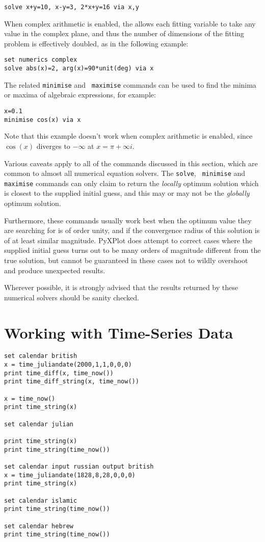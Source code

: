 \begin{verbatim}
solve x+y=10, x-y=3, 2*x+y=16 via x,y
\end{verbatim}

When complex arithmetic is enabled, the  allows each fitting
variable to take any value in the complex plane, and thus the number of
dimensions of the fitting problem is effectively doubled, as in the following
example:

\begin{verbatim}
set numerics complex
solve abs(x)=2, arg(x)=90*unit(deg) via x
\end{verbatim}

The related  {\tt minimise} and {\tt
maximise} commands can be used to find the minima or maxima of algebraic
expressions, for example:

\begin{verbatim}
x=0.1
minimise cos(x) via x
\end{verbatim}

\noindent Note that this example doesn't work when complex arithmetic is
enabled, since $\cos(x)$ diverges to $-\infty$ at $x=\pi+\infty i$.

Various caveats apply to all of the commands discussed in this section, which
are common to almost all numerical equation solvers. The {\tt solve}, {\tt
minimise} and {\tt maximise} commands can only claim to return the {\it
locally} optimum solution which is closest to the supplied initial guess, and
this may or may not be the {\it globally} optimum solution.

Furthermore, these commands usually work best when the optimum value they are
searching for is of order unity, and if the convergence radius of this solution
is of at least similar magnitude. PyXPlot does attempt to correct cases where
the supplied initial guess turns out to be many orders of magnitude different
from the true solution, but cannot be guaranteed in these cases not to wildly
overshoot and produce unexpected results.

Wherever possible, it is strongly advised that the results returned by these
numerical solvers should be sanity checked.

\section{Working with Time-Series Data}
\label{sec:time_series}

\begin{verbatim}
set calendar british
x = time_juliandate(2000,1,1,0,0,0)
print time_diff(x, time_now())
print time_diff_string(x, time_now())

x = time_now()
print time_string(x)

set calendar julian

print time_string(x)
print time_string(time_now())

set calendar input russian output british
x = time_juliandate(1828,8,28,0,0,0)
print time_string(x)

set calendar islamic
print time_string(time_now())

set calendar hebrew
print time_string(time_now())
\end{verbatim}
